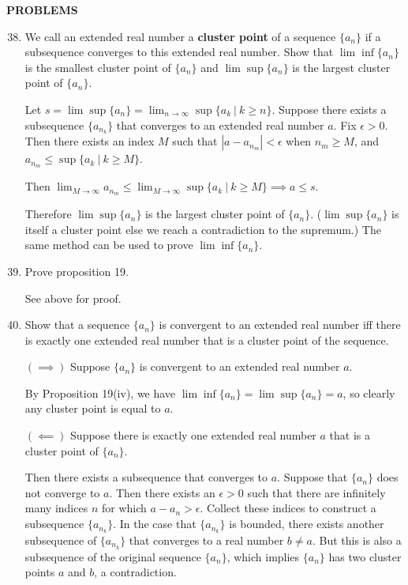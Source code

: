 \begin{center}
	\textbf{PROBLEMS}
\end{center}
\begin{enumerate}
	\setcounter{enumi}{37}
	\item We call an extended real number a \textbf{cluster point} of a sequence $\{ a_n\}$ if a subsequence converges to this extended real number. Show that $\lim \inf \{a_n\}$ is the smallest cluster point of $\{a_n\}$ and $\lim \sup \{a_n\}$ is the largest cluster point of $\{a_n\}$.\par
	Let $s = \lim \sup \{a_n\} = \lim_{n \to \infty} \sup \{ a_k\ |\ k \ge n\}$.
	Suppose there exists a subsequence $\{ a_{n_k} \}$ that converges to an extended real number $a$.
	Fix $\epsilon >0$. Then there exists an index $M$ such that $|a-a_{n_m}| < \epsilon$ when $n_m \ge M$, and $a_{n_m} \le \sup \{ a_k\ |\ k \ge M\}$.\par
	Then $\lim_{M \to \infty} a_{n_m} \le \lim_{M \to \infty} \sup \{ a_k\ |\ k \ge M\} \implies a \le s$.\par
	Therefore $\lim \sup \{a_n\}$ is the largest cluster point of $\{a_n\}$.
	($\lim \sup \{a_n\}$ is itself a cluster point else we reach a contradiction to the supremum.)
	The same method can be used to prove $\lim \inf \{a_n\}$.
	\item Prove proposition 19.\par
	See above for proof.
	\item Show that a sequence $\{a_n\}$ is convergent to an extended real number iff there is exactly one extended real number that is a cluster point of the sequence.\par
	$(\implies)$ Suppose $\{a_n\}$ is convergent to an extended real number $a$.\par
	By Proposition 19(iv), we have $\lim \inf \{a_n \}= \lim \sup \{a_n \} = a$, so clearly any cluster point is equal to $a$.
	\par
	$(\impliedby)$ Suppose there is exactly one extended real number $a$ that is a cluster point of $\{a_n\}$.\par
	Then there exists a subsequence that converges to $a$.
	Suppose that $\{a_n\}$ does not converge to $a$.
	Then there exists an $\epsilon > 0$ such that there are infinitely many indices $n$ for which $a-a_n > \epsilon$.
	Collect these indices to construct a subsequence $\{a_{n_k}\}$.
	In the case that $\{a_{n_k}\}$ is bounded, there exists another subsequence of $\{a_{n_k}\}$ that converges to a real number $b \neq a$. 
	But this is also a subsequence of the original sequence $\{a_n\}$, which implies $\{a_n\}$ has two cluster points $a$ and $b$, a contradiction.

\end{enumerate}
